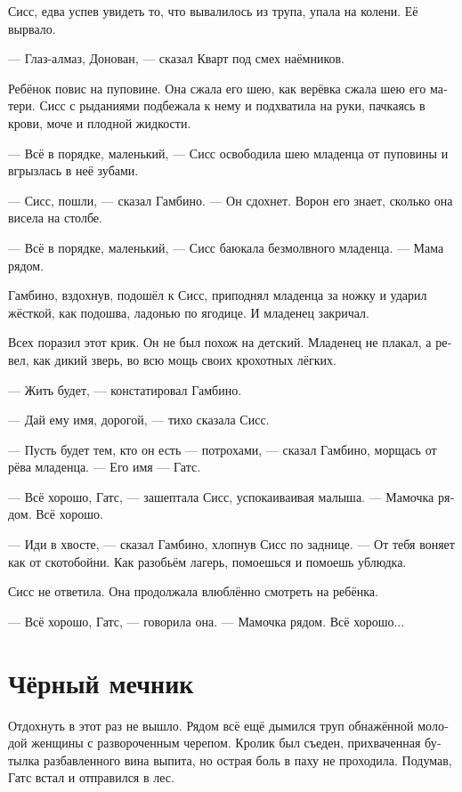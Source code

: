 \documentclass[a4paper,12pt,fleqn]{book}\usepackage{polyglossia}\setdefaultlanguage[babelshorthands=true]{russian}\setotherlanguage{english}\defaultfontfeatures{Ligatures=TeX,Mapping=tex-text}\usepackage{xcolor}\newcommand{\ml}[3]{#2}
\begin{document}
Сисс, едва успев увидеть то, что вывалилось из трупа, упала на колени.
Её вырвало.

--- Глаз-алмаз, Донован, --- сказал Кварт под смех наёмников.

Ребёнок повис на пуповине.
Она сжала его шею, как верёвка сжала шею его матери.
Сисс с рыданиями подбежала к нему и подхватила на руки, пачкаясь в крови, моче и плодной жидкости.

--- Всё в порядке, маленький, --- Сисс освободила шею младенца от пуповины и вгрызлась в неё зубами.

--- Сисс, пошли, --- сказал Гамбино.
--- Он сдохнет.
Ворон его знает, сколько она висела на столбе.

--- Всё в порядке, маленький, --- Сисс баюкала безмолвного младенца.
--- Мама рядом.

Гамбино, вздохнув, подошёл к Сисс, приподнял младенца за ножку и ударил жёсткой, как подошва, ладонью по ягодице.
И младенец закричал.

Всех поразил этот крик.
Он не был похож на детский.
Младенец не плакал, а ревел, как дикий зверь, во всю мощь своих крохотных лёгких.

--- Жить будет, --- констатировал Гамбино.

--- Дай ему имя, дорогой, --- тихо сказала Сисс.

--- Пусть будет тем, кто он есть --- потрохами, --- сказал Гамбино, морщась от рёва младенца.
--- Его имя --- Гатс.

--- Всё хорошо, Гатс, --- зашептала Сисс, успокаиваивая малыша.
--- Мамочка рядом.
Всё хорошо.

--- Иди в хвосте, --- сказал Гамбино, хлопнув Сисс по заднице.
--- От тебя воняет как от скотобойни.
Как разобьём лагерь, помоешься и помоешь ублюдка.

Сисс не ответила.
Она продолжала влюблённо смотреть на ребёнка.

--- Всё хорошо, Гатс, --- говорила она.
--- Мамочка рядом.
Всё хорошо...

\section{Чёрный мечник}

Отдохнуть в этот раз не вышло.
Рядом всё ещё дымился труп обнажённой молодой женщины с развороченным черепом.
Кролик был съеден, прихваченная бутылка разбавленного вина выпита, но острая боль в паху не проходила.
Подумав, Гатс встал и отправился в лес.
\end{document}
